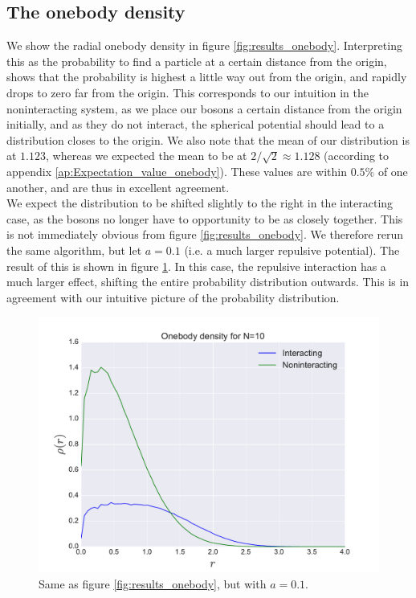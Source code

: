 \documentclass[a4paper, 10pt]{article}
\begin{document}
	 \subsection{The onebody density}\label{sec:Disc_onebody}
	 We show the radial onebody density in figure \ref{fig:results_onebody}. Interpreting this as the probability to find a particle at a certain distance from the origin, shows that the probability is highest a little way out from the origin, and rapidly drops to zero far from the origin. This corresponds to our intuition in the noninteracting system, as we place our bosons a certain distance from the origin initially, and as they do not interact, the spherical potential should lead to a distribution closes to the origin. We also note that the mean of our distribution is at $1.123$, whereas we expected the mean to be at $2/\sqrt{2}\approx 1.128$ (according to appendix \ref{ap:Expectation_value_onebody}). These values are within $0.5\%$ of one another, and are thus in excellent agreement.\\
	 \linebreak
	  We expect the distribution to be shifted slightly to the right in the interacting case, as the bosons no longer have to opportunity to be as closely together. This is not immediately obvious from figure \ref{fig:results_onebody}. We therefore rerun the same algorithm, but let $a=0.1$ (i.e. a much larger repulsive potential). The result of this is shown in figure \ref{fig:disc_onebody}. In this case, the repulsive interaction has a much larger effect, shifting the entire probability distribution outwards. This is in agreement with our intuitive picture of the probability distribution.
	 \begin{figure}[ht!]
	 	\centering
	 	\includegraphics[scale=0.8]{../Results/Onebody_density/onebodyHighAlpha.pdf}
	 	\caption{Same as figure \ref{fig:results_onebody}, but with $a=0.1$.}\label{fig:disc_onebody}
	 \end{figure}
	 \pagebreak
\end{document}
